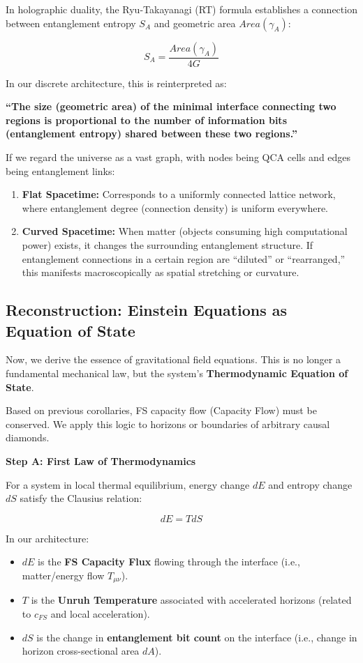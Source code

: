 In holographic duality, the Ryu-Takayanagi (RT) formula establishes a connection between entanglement entropy $S_A$ and geometric area $Area(\gamma_A)$:

$$S_A = \frac{Area(\gamma_A)}{4G}$$

In our discrete architecture, this is reinterpreted as:

\textbf{``The size (geometric area) of the minimal interface connecting two regions is proportional to the number of information bits (entanglement entropy) shared between these two regions.''}

If we regard the universe as a vast graph, with nodes being QCA cells and edges being entanglement links:

\begin{enumerate}
\item \textbf{Flat Spacetime:} Corresponds to a uniformly connected lattice network, where entanglement degree (connection density) is uniform everywhere.

\item \textbf{Curved Spacetime:} When matter (objects consuming high computational power) exists, it changes the surrounding entanglement structure. If entanglement connections in a certain region are ``diluted'' or ``rearranged,'' this manifests macroscopically as spatial stretching or curvature.
\end{enumerate}

\subsection{Reconstruction: Einstein Equations as Equation of State}

Now, we derive the essence of gravitational field equations. This is no longer a fundamental mechanical law, but the system's \textbf{Thermodynamic Equation of State}.

Based on previous corollaries, FS capacity flow (Capacity Flow) must be conserved. We apply this logic to horizons or boundaries of arbitrary causal diamonds.

\textbf{Step A: First Law of Thermodynamics}

For a system in local thermal equilibrium, energy change $dE$ and entropy change $dS$ satisfy the Clausius relation:

$$dE = T dS$$

In our architecture:

\begin{itemize}
\item $dE$ is the \textbf{FS Capacity Flux} flowing through the interface (i.e., matter/energy flow $T_{\mu\nu}$).

\item $T$ is the \textbf{Unruh Temperature} associated with accelerated horizons (related to $c_{FS}$ and local acceleration).

\item $dS$ is the change in \textbf{entanglement bit count} on the interface (i.e., change in horizon cross-sectional area $dA$).
\end{itemize}

